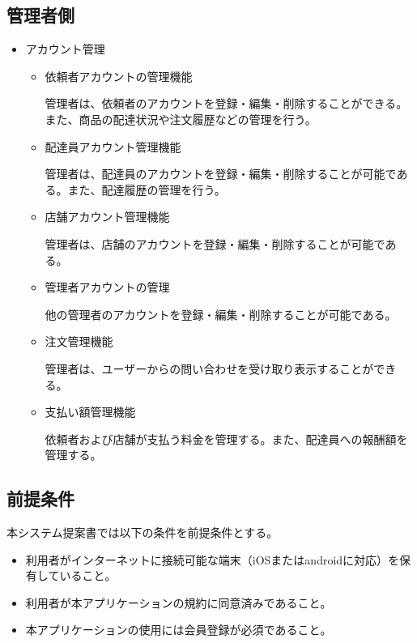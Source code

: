 \subsection{管理者側}

\begin{itemize}
  \item アカウント管理
    \begin{itemize}
        \item 依頼者アカウントの管理機能
        
        管理者は、依頼者のアカウントを登録・編集・削除することができる。また、商品の配達状況や注文履歴などの管理を行う。


        \item 配達員アカウント管理機能
        
        管理者は、配達員のアカウントを登録・編集・削除することが可能である。また、配達履歴の管理を行う。

        \item 店舗アカウント管理機能

        管理者は、店舗のアカウントを登録・編集・削除することが可能である。
        
        \item 管理者アカウントの管理

        他の管理者のアカウントを登録・編集・削除することが可能である。
        
        \item 注文管理機能
        
        管理者は、ユーザーからの問い合わせを受け取り表示することができる。

        \item 支払い額管理機能

        依頼者および店舗が支払う料金を管理する。また、配達員への報酬額を管理する。


    \end{itemize}
  
\end{itemize}

\subsection{前提条件}
 本システム提案書では以下の条件を前提条件とする。

 \begin{itemize}
  \item 利用者がインターネットに接続可能な端末（iOSまたはandroidに対応）を保有していること。
  \item 利用者が本アプリケーションの規約に同意済みであること。
  \item 本アプリケーションの使用には会員登録が必須であること。
\end{itemize}

